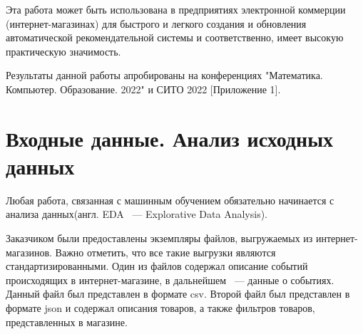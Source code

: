 \documentclass[14pt]{mmcs_article}
\begin{document}
Эта работа может быть использована в предприятиях электронной коммерции (интернет-магазинах) для быстрого и легкого создания и обновления автоматической рекомендательной системы и соответственно, имеет высокую практическую значимость.

Результаты данной работы апробированы на конференциях "Математика. Компьютер. Образование. 2022" и СИТО 2022 [Приложение 1].

\newpage


\section{Входные данные. Анализ исходных данных}\label{dsfs}
Любая работа, связанная с машинным обучением обязательно начинается с анализа данных(англ. EDA ~--- Explorative Data Analysis).

Заказчиком были предоставлены экземпляры файлов, выгружаемых из интернет-магазинов. Важно отметить, что все такие выгрузки являются стандартизированными. Один из файлов содержал описание событий происходящих в интернет-магазине, в дальнейшем ~--- данные о событиях. Данный файл был представлен в формате csv. Второй файл был представлен в формате json и содержал описания товаров, а также фильтров товаров, представленных в магазине. 
\end{document}
